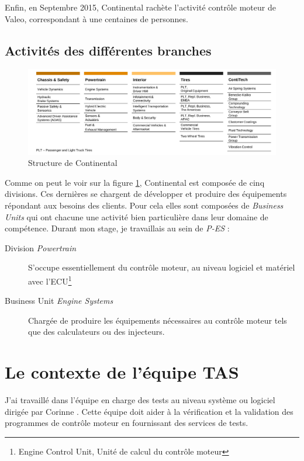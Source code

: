 Enfin, en Septembre 2015, Continental rachète l'activité contrôle moteur de Valeo, correspondant à une centaines de personnes.

\subsection{Activités des différentes branches}
\begin{figure}[H]
	\hspace{-40px}
	\includegraphics[width=20cm]{contents/images/structureConti.jpg}
	\caption{Structure de Continental}
	\label{fig:structConti}
\end{figure}

Comme on peut le voir sur la figure \ref{fig:structConti}, Continental est composée de cinq divisions. Ces dernières se chargent de développer et produire des équipements répondant aux besoins des clients. Pour cela elles sont composées de \textit{Business Units} qui ont chacune une activité bien particulière dans leur domaine de compétence. 
Durant mon stage, je travaillais au sein de \textit{P-ES} : 
\begin{description}
	\item[Division \textit{Powertrain}] S'occupe essentiellement du contrôle moteur, au niveau logiciel et matériel avec l'ECU\footnote{Engine Control Unit, Unité de calcul du contrôle moteur}
	\item[Business Unit \textit{Engine Systems}] Chargée de produire les équipements nécessaires au contrôle moteur tels que des calculateurs ou des injecteurs.
\end{description}

\section{Le contexte de l'équipe TAS}
J'ai travaillé dans l'équipe en charge des tests au niveau système ou logiciel dirigée par Corinne . Cette équipe doit aider à la vérification et la validation des programmes de contrôle moteur en fournissant des services de tests. 


